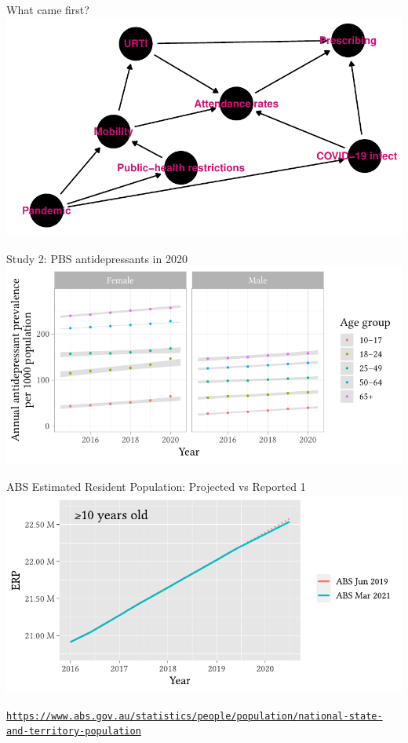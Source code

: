 \documentclass[aspectratio=169,12pt]{beamer} %
\begin{document}
\begin{frame}{What came first?}
\centering
\includegraphics[height=0.8\textheight]
        {ref/dag.pdf}
\end{frame}

\begin{frame}{Study 2: PBS antidepressants in 2020}
\centering
\includegraphics[height=0.8\textheight]
        {ref/covid19mh-prev-age.pdf}
	\nocite{costa_2023}
\end{frame}

\begin{frame}{ABS Estimated Resident Population: Projected vs Reported 1}
	\center\includegraphics[height=0.75\textheight]{ref/pops-overall.pdf}
	\begin{flushright}\tiny\texttt{\url{https://www.abs.gov.au/statistics/people/population/national-state-and-territory-population}}\end{flushright}
\end{frame}
\end{document}
